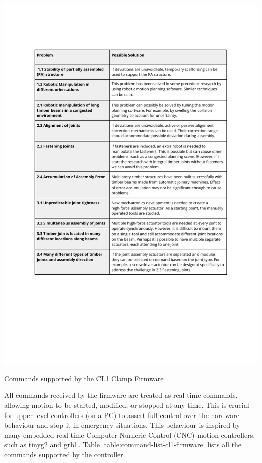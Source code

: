 \begin{table}[thb]
    \includegraphics[page=8, trim=25.4mm 130mm 25.4mm 33mm, clip, width=\textwidth]{tables/Tables in Chapter 4.pdf}
    \caption{Commands supported by the CL1 Clamp Firmware}
    \label{table:command-list-cl1-firmware}
\end{table}


All commands received by the firmware are treated as real-time commands, allowing motion to be started, modified, or stopped at any time. This is crucial for upper-level controllers (on a PC) to assert full control over the hardware behaviour and stop it in emergency situations. This behaviour is inspired by many embedded real-time Computer Numeric Control (CNC) motion controllers, such as tinyg2 \parencite{G2core2023} and grbl \parencite{jeonGrbl2019}.
Table \ref{table:command-list-cl1-firmware} lists all the commands supported by the controller.


